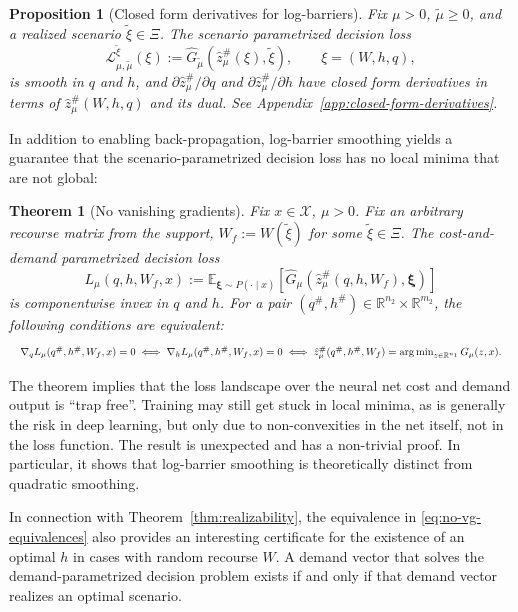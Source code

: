 \documentclass{article}
\newcommand{\R}{\mathbb{R}}
\newcommand{\E}{\mathbb{E}}
\newcommand{\1}{\mathbf{1}}
\newcommand{\argmin}{\operatorname*{arg\,min}}
\theoremstyle{plain}
\newtheorem{theorem}{Theorem}
\newtheorem{proposition}{Proposition}
\theoremstyle{definition}
\theoremstyle{remark}
\begin{document}
\begin{proposition}[Closed form derivatives for log-barriers]
\label{prop:logbarrier-derivatives}
Fix $\mu>0$, $\tilde\mu\geq 0$, and a realized scenario $\tilde\xi\in\Xi$. The scenario parametrized decision loss
\[
\mathcal L_{\mu,\tilde\mu}^{\tilde\xi}(\xi)
:=
\hat G_{\tilde\mu}\!\left(\hat z_\mu^\#(\xi),\tilde\xi\right),
\qquad
\xi=(W,h,q),
\]
is smooth in $q$ and $h$, and $\partial \hat z_\mu^\#/\partial q$ and $\partial \hat z_\mu^\#/\partial h$ have closed form derivatives in terms of $\hat z_\mu^\#(W,h,q)$ and its dual. See Appendix~\ref{app:closed-form-derivatives}.
\end{proposition}

In addition to enabling back-propagation, log-barrier smoothing yields a guarantee that the scenario-parametrized decision loss has no local minima that are not global:

\begin{theorem}[No vanishing gradients]
\label{thm:no-vanishing-gradients}
Fix $x \in \mathcal X$, $\mu > 0$. Fix an arbitrary recourse matrix from the support, $W_f:=W(\tilde\xi)$ for some $\tilde\xi\in\Xi$.
The cost-and-demand parametrized decision loss
\[
L_\mu(q,h,W_f,x)
:=
\E_{\boldsymbol{\xi}\sim P(\cdot\mid x)}
\!\left[
\hat G_\mu\!\left(\hat z_\mu^\#(q,h,W_f),\boldsymbol{\xi}\right)
\right]
\]
is componentwise invex in $q$ and $h$.
For a pair $(q^\#,h^\#)\in\R^{n_2}\times\R^{m_2}$, the following conditions are equivalent:
\begin{equation}
\label{eq:no-vg-equivalences}
\resizebox{\textwidth}{!}{$
\nabla_q L_\mu(q^\#,h^\#,W_f,x)=0
\;\Longleftrightarrow\;
\nabla_h L_\mu(q^\#,h^\#,W_f,x)=0
\;\Longleftrightarrow\;
\hat z_\mu^\#(q^\#,h^\#,W_f)=\argmin_{z\in\R^{n_1}}G_\mu(z,x).
$}
\end{equation}
\end{theorem}

The theorem implies that the loss landscape over the neural net cost and demand output is ``trap free''.
Training may still get stuck in local minima, as is generally the risk in deep learning, but only due to non-convexities in the net itself, not in the loss function.
The result is unexpected and has a non-trivial proof. In particular, it shows that log-barrier smoothing is theoretically distinct from quadratic smoothing.

In connection with Theorem~\ref{thm:realizability}, the equivalence in \eqref{eq:no-vg-equivalences} also provides an interesting certificate for the existence of an optimal $h$ in cases with random recourse $W$. A demand vector that solves the demand-parametrized decision problem exists if and only if that demand vector realizes an optimal scenario.
\end{document}
